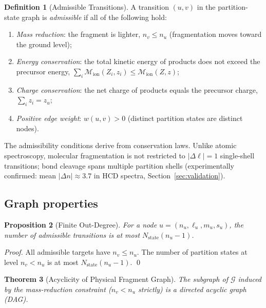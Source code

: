\documentclass[twocolumn,10pt,a4paper]{article}
\theoremstyle{thmstyle}
\newtheorem{theorem}{Theorem}[section]
\newtheorem{proposition}[theorem]{Proposition}
\theoremstyle{definition}
\newtheorem{definition}[theorem]{Definition}
\theoremstyle{remark}
\newcommand{\Mop}{\mathcal{M}}
\newcommand{\calG}{\mathcal{G}}
\begin{document}
\begin{definition}[Admissible Transitions]
\label{def:admissible}
A transition $(u, v)$ in the partition-state graph is \emph{admissible}
if all of the following hold:
\begin{enumerate}[nosep,label=(\roman*)]
\item \emph{Mass reduction}: the fragment is lighter, $n_v \leq n_u$
  (fragmentation moves toward the ground level);
\item \emph{Energy conservation}: the total kinetic energy of products
  does not exceed the precursor energy,
  $\sum_i \Mop_\text{ion}(Z_i, z_i) \leq \Mop_\text{ion}(Z, z)$;
\item \emph{Charge conservation}: the net charge of products equals the
  precursor charge, $\sum_i z_i = z_u$;
\item \emph{Positive edge weight}: $w(u,v) > 0$ (distinct partition
  states are distinct nodes).
\end{enumerate}
\end{definition}

The admissibility conditions derive from conservation laws. Unlike
atomic spectroscopy, molecular fragmentation is not restricted to
$|\Delta\ell| = 1$ single-shell transitions; bond cleavage spans
multiple partition shells (experimentally confirmed: mean $|\Delta n|
\approx 3.7$ in HCD spectra, Section~\ref{sec:validation}).

\subsection{Graph properties}

\begin{proposition}[Finite Out-Degree]
\label{prop:outdegree}
For a node $u = (n_u,\ell_u,m_u,s_u)$, the number of admissible
transitions is at most $N_\text{state}(n_u - 1)$.
\end{proposition}

\begin{proof}
All admissible targets have $n_v \leq n_u$. The number of partition
states at level $n_v < n_u$ is at most $N_\text{state}(n_u - 1)$.
\qed
\end{proof}

\begin{theorem}[Acyclicity of Physical Fragment Graph]
\label{thm:acyclic}
The subgraph of $\calG$ induced by the mass-reduction constraint
($n_v < n_u$ strictly) is a directed acyclic graph (DAG).
\end{theorem}
\end{document}
